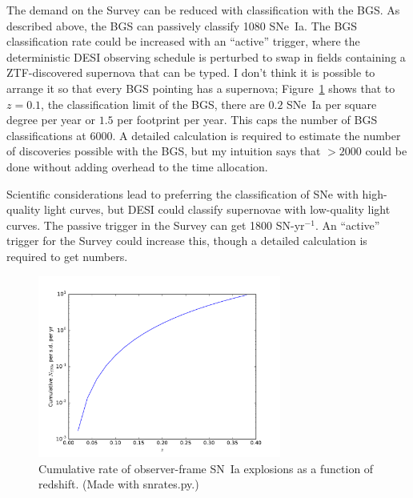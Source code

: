 \documentclass{article}   	%
\begin{document}
The demand on the Survey can be reduced with classification with the BGS.  As described above, the BGS can passively
classify 1080 SNe~Ia.  The BGS classification rate could be increased with an
``active'' trigger, where the deterministic DESI observing schedule is perturbed to swap in fields containing
a ZTF-discovered
supernova that can be typed.
I don't think it is possible to arrange it so that every BGS pointing has a supernova; Figure~\ref{total:fig} shows that 
to $z=0.1$, the classification limit of the BGS, there are $0.2$ SNe~Ia per square degree per year or $1.5$ per footprint per year.
This caps the number of BGS classifications at 6000.  A detailed calculation is required to estimate the number of discoveries
possible with the BGS, but my intuition says that $>2000$ could be done without adding overhead to the time allocation.

Scientific considerations lead to preferring the classification of SNe with high-quality light curves, but DESI could classify supernovae with low-quality light curves.  The passive trigger in the Survey can get 1800 SN-yr$^{-1}$.  An ``active''
trigger for the Survey could increase this, though a detailed calculation is required to get numbers.

\color{black}

\begin{figure}[h]
\includegraphics[width=8cm]{../src/total.pdf}
\centering
\caption{Cumulative rate of observer-frame SN~Ia explosions as a function of redshift. 
(Made with snrates.py.)
\label{total:fig}}
\end{figure}
\end{document}
